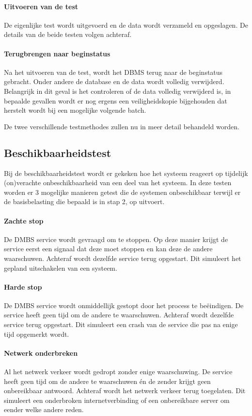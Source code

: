 \paragraph{Uitvoeren van de test} De eigenlijke test wordt uitgevoerd en de data wordt verzameld en opgeslagen. De details van de beide testen volgen achteraf. 

\paragraph{Terugbrengen naar beginstatus} Na het uitvoeren van de test, wordt het \gls{DBMS} terug naar de beginstatus gebracht. Onder andere de database en de data wordt volledig verwijderd. Belangrijk in dit geval is het controleren of de data volledig verwijderd is, in bepaalde gevallen wordt er nog ergens een veiligheidskopie bijgehouden dat herstelt wordt bij een mogelijke volgende batch. 

De twee verschillende testmethodes zullen nu in meer detail behandeld worden. 
\subsection{Beschikbaarheidstest}
Bij de beschikbaarheidstest wordt er gekeken hoe het systeem reageert op tijdelijk (on)verachte onbeschikbaarheid van een deel van het systeem. In deze testen worden er 3 mogelijke manieren getest die de systemen onbeschikbaar terwijl er de basisbelasting die bepaald is in stap 2, op uitvoert. 

\paragraph{Zachte stop} De DMBS service wordt gevraagd om te stoppen. Op deze manier krijgt de service eerst een signaal dat deze moet stoppen en kan deze de andere waarschuwen. Achteraf wordt dezelfde service terug opgestart. Dit simuleert het gepland uitschakelen van een systeem. 

\paragraph{Harde stop} De DMBS service wordt onmiddellijk gestopt door het process te beëindigen. De service heeft geen tijd om de andere te waarschuwen. Achteraf wordt dezelfde service terug opgestart. Dit simuleert een crash van de service die pas na enige tijd opgemerkt wordt. 

\paragraph{Netwerk onderbreken} Al het netwerk verkeer wordt gedropt zonder enige waarschuwing. De service heeft geen tijd om de andere te waarschuwen én de zender krijgt geen onbereikbaar antwoord. Achteraf wordt het netwerk verkeer terug toegelaten. Dit simuleert een onderbroken internetverbinding of een onbereikbare server om eender welke andere reden.  

